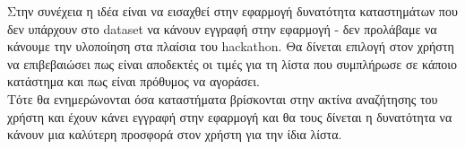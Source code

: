\documentclass[a4paper,10pt]{report}
\begin{document}
Στην συνέχεια η ιδέα είναι να εισαχθεί στην εφαρμογή δυνατότητα καταστημάτων 
που δεν υπάρχουν στο dataset να κάνουν εγγραφή στην εφαρμογή - δεν προλάβαμε να 
κάνουμε την υλοποίηση στα πλαίσια του hackathon. Θα δίνεται επιλογή στον χρήστη να 
επιβεβαιώσει πως είναι αποδεκτές οι τιμές για τη λίστα που συμπλήρωσε σε κάποιο 
κατάστημα και πως είναι πρόθυμος να αγοράσει. \\
Τότε θα ενημερώνονται όσα καταστήματα βρίσκονται στην ακτίνα αναζήτησης του χρήστη
και έχουν κάνει εγγραφή στην εφαρμογή και θα τους δίνεται η δυνατότητα να κάνουν
μια καλύτερη προσφορά στον χρήστη για την ίδια λίστα.\\
 
\end{document}
